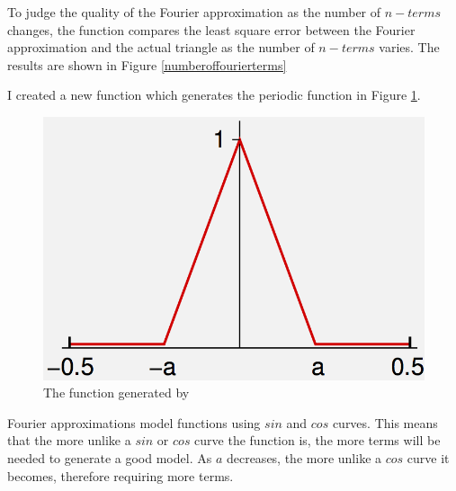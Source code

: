 \documentclass{article}
\begin{document}
To judge the quality of the Fourier approximation as the number of $ n-terms $ changes, the function  compares the least square error between the Fourier approximation and the actual triangle as the number of $ n-terms $ varies. The results are shown in Figure \ref{numberoffourierterms}

I created a new function  which generates the periodic function in Figure \ref{periodtrinew}.



\begin{figure}[h]
\centering
	\begin{minipage}[c][][b]{0.45\linewidth}
		\begin{center}
		\includegraphics[scale=0.25]{Matlab/Fourier/Images/fs_periodictrianglenew.png}  
		\end{center}
		\caption[b]{The function generated by }
		\label{periodtrinew}
	\end{minipage}
\quad\quad\quad\quad

\end{figure}

Fourier approximations model functions using $sin$ and $cos$ curves. This means that the more unlike a $sin$ or $cos$ curve the function is, the more terms will be needed to generate a good model. As $a$ decreases, the more unlike a $cos$ curve it becomes, therefore requiring more terms. 
\end{document}
